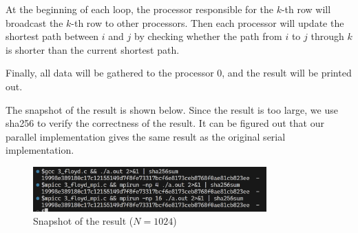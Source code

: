 At the beginning of each loop, the processor responsible for the $k$-th row will broadcast the $k$-th row to other processors. Then each processor will update the shortest path between $i$ and $j$ by checking whether the path from $i$ to $j$ through $k$ is shorter than the current shortest path.

Finally, all data will be gathered to the processor 0, and the result will be printed out.

The snapshot of the result is shown below. Since the result is too large, we use sha256 to verify the correctness of the result. It can be figured out that our parallel implementation gives the same result as the original serial implementation.

\begin{figure}[h]
    \centering
    \includegraphics[width=0.8\textwidth]{fig-floyd-1024.png}
    \caption{Snapshot of the result ($N=1024$)}
    \label{fig:floyd-1024}
\end{figure}